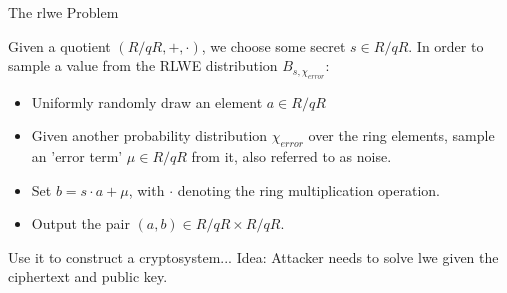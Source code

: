 \begin{frame}{The \gls{rlwe} Problem}
  \begin{corollary}
    Given a quotient $(R/qR, +, \cdot)$, we choose some secret $s \in R/qR$.
    In order to sample a value from the RLWE distribution $B_{s, \chi_{error}}$:
    \begin{itemize}
      \item Uniformly randomly draw an element $a \in R/qR$
      \item Given another probability distribution $\chi_{error}$ over the ring elements, sample an 'error term' $\mu \in R/qR$ from it, also referred to as noise.
      \item Set $b = s \cdot a + \mu$, with $\cdot$ denoting the ring multiplication operation.
      \item Output the pair $(a, b) \in R/qR \times R/qR$.
    \end{itemize}
  \end{corollary}

  Use it to construct a cryptosystem...
  Idea: Attacker needs to solve \gls{lwe} given the ciphertext and public key.
\end{frame}
